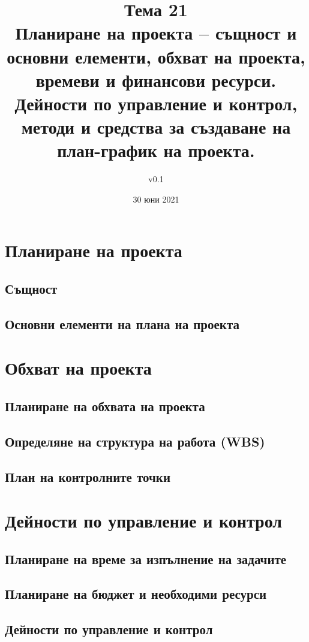 \documentclass[fleqn,12pt]{article}
\title{Тема 21 \\Планиране на проекта – същност и основни елементи, обхват на проекта, времеви и финансови ресурси. Дейности по управление и контрол, методи и средства за създаване на план-график на проекта.}
\author{v0.1}
\date{30 юни 2021}
\begin{document}
\maketitle
\tableofcontents
\pagebreak

\section{Планиране на проекта}

\subsection{Същност}
\subsection{Основни елементи на плана на проекта}

\section{Обхват на проекта}

\subsection{Планиране на обхвата на проекта}
\subsection{Определяне на структура на работа (WBS)}
\subsection{План на контролните точки}

\section{Дейности по управление и контрол}

\subsection{Планиране на време за изпълнение на задачите}
\subsection{Планиране на бюджет и необходими ресурси}
\subsection{Дейности по управление и контрол}
\end{document}
